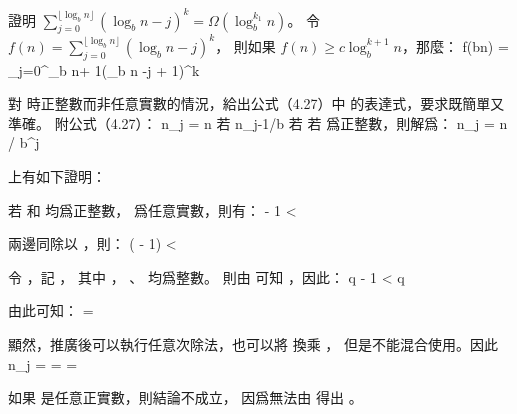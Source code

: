 \startsection[
  title={Proof of the master theorem},
]

\startEXERCISE
證明 $\sum_{j=0}^{\lfloor \log_b n\rfloor}(\log_b n - j)^k = \Omega(\log_b^{k_1}n)$。
\stopEXERCISE
\startANSWER
令 $f(n)=\sum_{j=0}^{\lfloor \log_b n\rfloor}(\log_b n - j)^k$，
則如果 $f(n)\ge c \log_b^{k+1}n$，那麼：
\startformula
f(bn) = \sum_{j=0}^{\lfloor \log_b n\rfloor + 1}(\log_b n -j + 1)^k
\stopformula
\stopANSWER

\startEXERCISE \DIFFICULT
對  時正整數而非任意實數的情況，給出公式（4.27）中  的表達式，要求既簡單又準確。
附公式（4.27）：
\startformula
 n_j = \startmathcases
   \NC n \NC 若  \NR
   \NC \left\lceil n_{j-1}/b \right\rceil \NC 若  \NR
\stopmathcases
\stopformula
\stopEXERCISE
\startANSWER
若  爲正整數，則解爲：
\startformula
n_j = \left\lceil n / b^j \right\rceil
\stopformula

 上有如下證明：

若  和  均爲正整數，  爲任意實數，則有：
\startformula
\left\lceil {} \right\rceil - 1
< 
\le \left\lceil {} \right\rceil
\stopformula

兩邊同除以 ，則：
\startformula
{}(\left\lceil {} \right\rceil - 1)
< 
\le {} \left\lceil {} \right\rceil
\stopformula

令 ，記 ，
其中 ， 、  均爲整數。
則由  可知 ，因此：
\startformula
q - 1 \le {} <  \le {} \le q
\stopformula

由此可知：
\startformula
\left\lceil {} \right\rceil = \left\lceil {} \left\lceil {} \right\rceil \right\rceil
\stopformula

顯然，推廣後可以執行任意次除法，也可以將 \m{\left\lceil \right\rceil} 換乘 \m{\lfloor \rfloor}，
但是不能混合使用。因此
\startformula
n_j = \left\lceil {} \right\rceil
    = \left\lceil {} \left\lceil {} \right\rceil \right\rceil
    = \left\lceil {} \right\rceil
\stopformula

如果  是任意正實數，則結論不成立，
因爲無法由  得出 。
\stopANSWER

